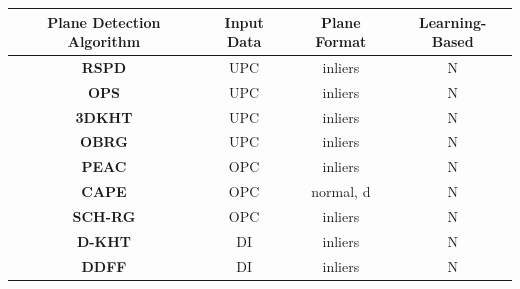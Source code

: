 \documentclass[main.tex]{subfiles}
\begin{document}
\begin{table}[H]
    \centering
    \begin{tabular}{c|c|c|c}
        \textbf{Plane Detection Algorithm}                               & \textbf{Input Data} & \textbf{Plane Format} & \textbf{Learning-Based} \\ \hline%
        \textbf{RSPD} \cite{Araújo_Oliveira_2020}                        & UPC                 & inliers               & N                       \\ %
        \textbf{OPS} \cite{Sun_Mordohai_2019}                            & UPC                 & inliers               & N                       \\ %
        \textbf{3DKHT} \cite{Limberger_Oliveira_2015}                    & UPC                 & inliers               & N                       \\ %
        \textbf{OBRG} \cite{Vo_Truong-Hong_Laefer_Bertolotto_2015}       & UPC                 & inliers               & N                       \\ %
        \textbf{PEAC} \cite{Feng_Taguchi_Kamat_2014}                     & OPC                 & inliers               & N                       \\ %
        \textbf{CAPE} \cite{Proença_Gao_2018}                            & OPC                 & normal, d             & N                       \\ %
        \textbf{SCH-RG} \cite{Mols_Li_Hanebeck_2020}                     & OPC                 & inliers               & N                       \\ %
        \textbf{D-KHT}  \cite{Vera_Lucio_Fernandes_Velho_2018}           & DI                  & inliers               & N                       \\ %
        \textbf{DDFF} \cite{Roychoudhury_Missura_Bennewitz_2021}         & DI                  & inliers               & N                       \\ %

\end{tabular}
\end{table}
\end{document}
